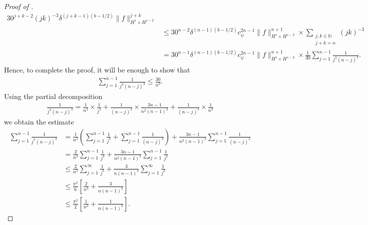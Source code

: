 \documentclass[12pt,reqno]{amsart}
\numberwithin{equation}{section}  %
\renewcommand{\cref}{\Cref}
\begin{document}
\begin{proof}[Proof of \cref{pre-lip-qwp}]
\begin{equation}
\begin{split}
    30^{j+k-2} (jk)^{-3} \delta^{(j + k -1)(b-1/2)} \| f \|_{H^{s} \times
    H^{s-2}}^{j+k}
    \\
    &  \le  30^{n-2} \delta^{(n-1)(b-1/2)}
    c_{\psi}^{2n-1} \| f \|^{n+1}_{H^{s} \times H^{s-2}} \times 
    \sum_{\substack{j, k \in \mathbb{N}\\ j + k = n}}  (jk)^{-3}
    \\
    & = 30^{n-1} \delta^{(n-1)(b-1/2)}
    c_{\psi}^{2n-1} \| f \|^{n+1}_{H^{s} \times H^{s-2}} \times \frac{1}{30}
    \sum_{j=1}^{n-1}
    \frac{1}{j^{3}(n-j)^{3}}.
    \end{split}
  \end{equation}
Hence, to complete the proof, it will be enough to show that
  \begin{equation*}
  \begin{split}
  \sum_{j=1}^{n-1}
  \frac{1}{j^{3}(n-j)^{3}} \le \frac{30}{n^{3}}.
  \end{split}
  \end{equation*}
  Using the partial decomposition
  \begin{equation*}
  \begin{split}
    \frac{1}{j^{3}(n-j)^{3}} = \frac{1}{n^{3}} \times \frac{1}{j^{3}} +
    \frac{1}{(n-j)^{2}} \times \frac{3n-1}{n^{2}(n-1)^{3}} +
    \frac{1}{(n-j)^{3}} \times \frac{1}{n^{3}}
  \end{split}
  \end{equation*}
  we obtain the estimate
  \begin{equation}
    \label{pre-sum-est}
  \begin{split}
    \sum_{j=1}^{n-1} \frac{1}{j^{3}(n-j)^{3}}
    & = \frac{1}{n^{3}} \left(
    \sum_{j=1}^{n-1} \frac{1}{j^{3}} + \sum_{j=1}^{n-1}
    \frac{1}{(n-j)^{3}}
    \right) + \frac{3n-1}{n^{2}(n-1)^{3}} \sum_{j=1}^{n-1}
    \frac{1}{(n-j)^{2}}
    \\
    & = \frac{2}{n^{3}} \sum_{j=1}^{n-1} \frac{1}{j^{3}} +
    \frac{3n-1}{n^{2}(n-1)^{3}} \sum_{j=1}^{n-1} \frac{1}{j^{2}}
    \\
    & \le \frac{2}{n^{3}} \sum_{j=1}^{\infty} \frac{1}{j^{3}} +
    \frac{3}{n(n-1)^{3}} \sum_{j=1}^{\infty} \frac{1}{j^{2}}
    \\
    & \le \frac{\pi^{2}}{6} \left[ \frac{2}{n^{3}} + \frac{3}{n(n-1)^{3}} \right]
    \\
    & \le \frac{\pi^{2}}{2} \left[ \frac{1}{n^{3}} + \frac{1}{n(n-1)^{3}}
    \right].
  \end{split}
  \end{equation}

\end{proof}
\end{document}
